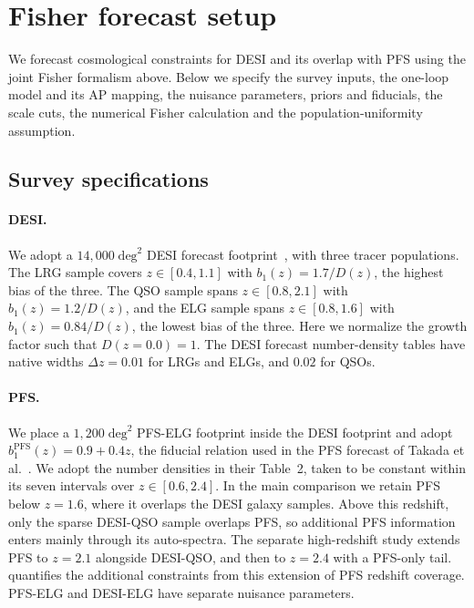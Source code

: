 \documentclass[a4paper,11pt]{article}
\newcommand{\revchange}[1]{{\color{RevisionColor}#1}}
\begin{document}
\section{Fisher forecast setup}
\label{sec:fisher}

\revchange{We forecast cosmological constraints for DESI and its overlap with PFS
using the joint Fisher formalism above. Below we specify the survey inputs,
the one-loop model and its AP mapping, the nuisance parameters,
priors and fiducials, the scale cuts, the numerical Fisher calculation and the
population-uniformity assumption.}

\subsection{Survey specifications}
\label{sec:surveys}

\paragraph{DESI.}\leavevmode%
\revchange{We adopt a $14{,}000\;\mathrm{deg}^2$ DESI forecast
footprint~\cite{DESI:2016fyo}, with three tracer populations.}
The LRG sample covers $z\in[0.4,1.1]$ with
$b_1(z)=1.7/D(z)$\revchange{, the highest bias of the three.
The QSO sample spans $z\in[0.8,2.1]$ with} $b_1(z)=1.2/D(z)$\revchange{,
and the ELG sample spans $z\in[0.8,1.6]$ with} $b_1(z)=0.84/D(z)$\revchange{,
the lowest bias of the three.
Here we normalize the growth factor such that $D(z=0.0)=1$.
The DESI forecast number-density
tables have native widths $\Delta z=0.01$ for LRGs and ELGs,
and $0.02$ for QSOs.}

\paragraph{PFS.}\leavevmode%
\revchange{We place a $1{,}200\;\mathrm{deg}^2$ PFS-ELG footprint inside
the DESI footprint and adopt $b_1^{\mathrm{PFS}}(z)=0.9+0.4z$,
the fiducial relation used in the PFS
forecast of Takada et al.~\cite{Takada:2014pfs}. We adopt the
number densities in their Table~2, taken to be constant within
its seven intervals over $z\in[0.6,2.4]$.
In the main comparison we retain
PFS below $z=1.6$, where it overlaps the DESI galaxy samples. Above this
redshift, only the sparse DESI-QSO sample overlaps PFS, so additional PFS
information enters mainly through its auto-spectra. The separate high-redshift
study extends PFS to $z=2.1$ alongside DESI-QSO, and then to $z=2.4$ with a
PFS-only tail. \Cref{sec:redshift} quantifies the additional constraints from
this extension of PFS redshift coverage.
PFS-ELG and DESI-ELG have separate nuisance parameters.}
\end{document}
